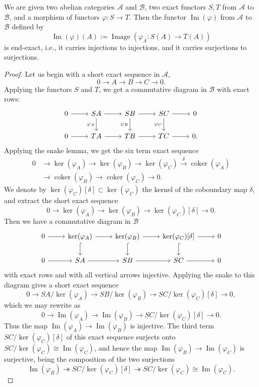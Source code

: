 We are given two abelian categories \(\mathcal{A}\) and \(\mathcal{B}\), two
exact functors \(S,T\) from \(\mathcal{A}\) to \(\mathcal{B}\), and a morphism
of functors \(\varphi:S\to T\). Then the functor \(\operatorname{Im}(\varphi)\)
from \(\mathcal{A}\) to \(\mathcal{B}\) defined by
\[
  \operatorname{Im}(\varphi)(A):=
  \operatorname{Image}(\varphi_A:S(A)\to T(A))
\]
is end-exact, i.e., it carries injections to injections, and it carries
surjections to surjections.
\begin{proof}
Let us begin with a short exact sequence in \(\mathcal{A}\),
\[
  0\to A\to B\to C\to0.
\]
Applying the functors \(S\) and \(T\), we get a commutative diagram in
\(\mathcal{B}\) with exact rows:
\[
\begin{tikzcd}
0 \arrow[r] & SA \arrow[r] \arrow[d,"\varphi_A"'] &
SB \arrow[r] \arrow[d,"\varphi_B"'] &
SC \arrow[r] \arrow[d,"\varphi_C"'] & 0\\
0 \arrow[r] & TA \arrow[r] & TB \arrow[r] & TC \arrow[r] & 0.
\end{tikzcd}
\]
Applying the snake lemma, we get the six term exact sequence
\[
\begin{aligned}
0&\to\ker(\varphi_A)\to\ker(\varphi_B)\to\ker(\varphi_C)
\xrightarrow{\delta}\operatorname{coker}(\varphi_A)\\
&\to\operatorname{coker}(\varphi_B)\to
\operatorname{coker}(\varphi_C)\to0.
\end{aligned}
\]
We denote by \(\ker(\varphi_C)[\delta]\subset\ker(\varphi_C)\) the kernel of
the coboundary map \(\delta\), and extract the short exact sequence
\[
  0\to\ker(\varphi_A)\to\ker(\varphi_B)\to
  \ker(\varphi_C)[\delta]\to0.
\]
Then we have a commutative diagram in \(\mathcal{B}\)
\[
\begin{tikzcd}
0 \arrow[r] & \ker(\varphi_A) \arrow[r] \arrow[d,hook] &
\ker(\varphi_B) \arrow[r] \arrow[d,hook] &
\ker(\varphi_C)[\delta] \arrow[r] \arrow[d,hook] & 0\\
0 \arrow[r] & SA \arrow[r] & SB \arrow[r] & SC \arrow[r] & 0
\end{tikzcd}
\]
with exact rows and with all vertical arrows injective. Applying the snake to
this diagram gives a short exact sequence
\[
  0\to SA/\ker(\varphi_A)\to SB/\ker(\varphi_B)
  \to SC/\ker(\varphi_C)[\delta]\to0,
\]
which we may rewrite as
\[
  0\to\operatorname{Im}(\varphi_A)\to\operatorname{Im}(\varphi_B)
  \to SC/\ker(\varphi_C)[\delta]\to0.
\]
Thus the map \(\operatorname{Im}(\varphi_A)\to\operatorname{Im}(\varphi_B)\)
is injective. The third term \(SC/\ker(\varphi_C)[\delta]\) of this exact
sequence surjects onto
\(SC/\ker(\varphi_C)\cong\operatorname{Im}(\varphi_C)\), and hence the map
\(\operatorname{Im}(\varphi_B)\to\operatorname{Im}(\varphi_C)\) is surjective,
being the composition of the two surjections
\[
  \operatorname{Im}(\varphi_B)\twoheadrightarrow
  SC/\ker(\varphi_C)[\delta]\twoheadrightarrow
  SC/\ker(\varphi_C)\cong\operatorname{Im}(\varphi_C).
\]
\end{proof}

